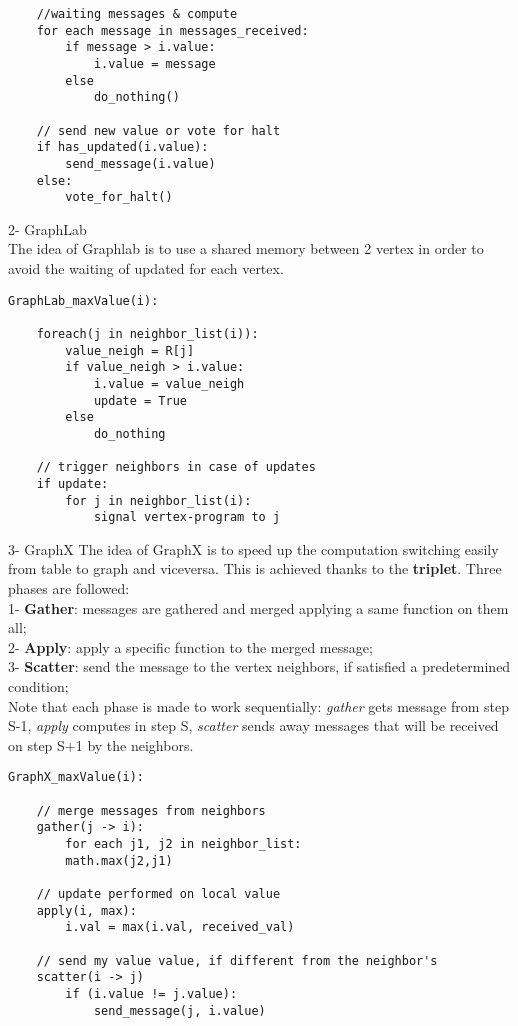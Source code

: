 \documentclass[]{report}
\begin{document}
\begin{enumerate}
\begin{verbatim}
    //waiting messages & compute
    for each message in messages_received:
        if message > i.value:
            i.value = message  
        else
            do_nothing()
            
    // send new value or vote for halt
    if has_updated(i.value):
        send_message(i.value)
    else:
        vote_for_halt()
\end{verbatim}

2- GraphLab\\
The idea of Graphlab is to use a shared memory between 2 vertex in order to avoid the waiting of updated for each vertex.
\begin{verbatim}
GraphLab_maxValue(i):

    foreach(j in neighbor_list(i)):
        value_neigh = R[j]
        if value_neigh > i.value:
            i.value = value_neigh
            update = True
        else
            do_nothing
            
    // trigger neighbors in case of updates
    if update:
        for j in neighbor_list(i):
            signal vertex-program to j
\end{verbatim}

3- GraphX
The idea of GraphX is to speed up the computation switching easily from table to graph and viceversa. This is achieved thanks to the \textbf{triplet}. Three phases are followed:     \\
1- \textbf{Gather}:  messages are gathered and merged applying a same function on them all; \\
2- \textbf{Apply}: apply a specific function to the merged message;\\
3- \textbf{Scatter}: send the message to the vertex neighbors, if satisfied a predetermined condition;\\
Note that each phase is made to work sequentially: \textit{gather} gets message from step S-1, \textit{apply} computes in step S, \textit{scatter} sends away messages that will be received on step S+1 by the neighbors.
\begin{verbatim}
GraphX_maxValue(i):

    // merge messages from neighbors
    gather(j -> i):
        for each j1, j2 in neighbor_list:
        math.max(j2,j1)
        
    // update performed on local value
    apply(i, max):
        i.val = max(i.val, received_val)
        
    // send my value value, if different from the neighbor's
    scatter(i -> j)
        if (i.value != j.value):
            send_message(j, i.value)
        
\end{verbatim}
\end{enumerate}
\end{document}
